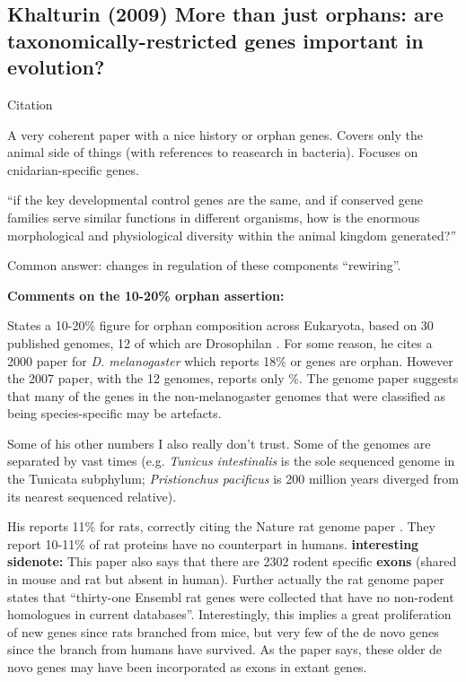 \subsection{Khalturin (2009) More than just orphans: are
taxonomically-restricted genes important in evolution?}

    Citation \cite{khalturin_more_2009}

    A very coherent paper with a nice history or orphan genes. Covers only
    the animal side of things (with references to reasearch in bacteria).
    Focuses on cnidarian-specific genes.

    ``if the key developmental control genes are the same, and if conserved
    gene families serve similar functions in different organisms, how is
    the enormous morphological and physiological diversity within the
    animal kingdom generated?''

    Common answer: changes in regulation of these components ``rewiring''.

    \textbf{Comments on the 10-20\% orphan assertion:}

    States a 10-20\% figure for orphan composition across Eukaryota, based
    on 30 published genomes, 12 of which are Drosophilan
    \cite{clark_evolution_2007}. For some reason, he cites a 2000 paper for
    \textit{D. melanogaster} which reports 18\% or genes are orphan.
    However the 2007 paper, with the 12 genomes, reports only \%. The
    genome paper suggests that many of the genes in the non-melanogaster
    genomes that were classified as being species-specific may be
    artefacts.

    Some of his other numbers I also really don't trust. Some of the
    genomes are separated by vast times (e.g. \textit{Tunicus intestinalis}
    is the sole sequenced genome in the Tunicata subphylum;
    \textit{Pristionchus pacificus} is 200 million years diverged from its
    nearest sequenced relative).
    
    His reports 11\% for rats, correctly citing the Nature rat genome paper
    \cite{gibbs_genome_2004}.  They report 10-11\% of rat proteins have no
    counterpart in humans.  \textbf{interesting sidenote:} This paper also
    says that there are 2302 rodent specific \textbf{exons} (shared in
    mouse and rat but absent in human).  Further actually the rat genome
    paper states that ``thirty-one Ensembl rat genes were collected that
    have no non-rodent homologues in current databases''. Interestingly,
    this implies a great proliferation of new genes since rats branched
    from mice, but very few of the de novo genes since the branch from
    humans have survived. As the paper says, these older de novo genes may
    have been incorporated as exons in extant genes.

